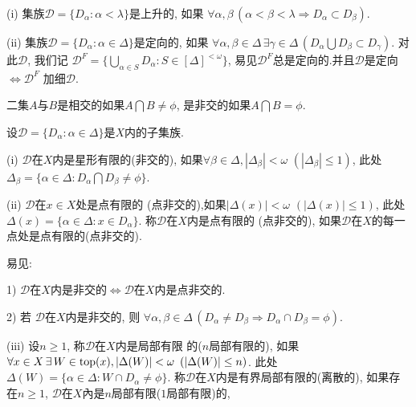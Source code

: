 \documentclass[main.tex]{subfiles}
\begin{document}
\begin{definition}
\textnormal{(i)} 集族$\mathscr{D}=\{D_\alpha: \alpha<\lambda\}$是上升的,
如果
$\forall\alpha, \beta \,(\alpha < \beta < \lambda \Rightarrow D_\alpha \subset D_\beta )$.

\textnormal{(ii)}  集族$\mathscr{D}=\{D_\alpha: \alpha\in\Delta\}$是定向的,
如果
$\forall\alpha, \beta\in\Delta\,\exists \gamma\in \Delta\,
(D_\alpha \bigcup D_\beta \subset D_\gamma)$.
对此$\mathscr{D}$, 我们记
$\mathscr{D}^F = \{\bigcup_{\alpha\in S} D_\alpha: S\in [\Delta]^{<\omega}\}$,
易见$\mathscr{D}^F$总是定向的.并且$\mathscr{D}$是定向
$\Leftrightarrow \mathscr{D}^F$ 加细$\mathscr{D}$.
\end{definition}
二集$A$与$B$是相交的如果$A\bigcap B\ne \phi$, 
是非交的如果$A\bigcap B=\phi$.

\begin{definition}
设$\mathscr{D}=\{D_\alpha: \alpha\in \Delta\}$是$X$内的子集族.

\textnormal{(i)} $\mathscr{D}$在$X$内是星形有限的\textnormal{(}非交的\textnormal{)}, 
如果$\forall\beta\in\Delta, |\Delta_\beta| < \omega$ $(|\Delta_\beta| \le 1)$, 此处
$\Delta_\beta = \{\alpha\in\Delta: D_\alpha\bigcap D_\beta \ne \phi\}$.
 
\textnormal{(ii)} $\mathscr{D}$在$x\in X$处是点有限的
\textnormal{(}点非交的\textnormal{)},如果$|\Delta(x)| < \omega$ $(|\Delta(x)| \le 1)$, 此处
$\Delta(x) = \{\alpha\in\Delta: x\in D_\alpha\}$.
称$\mathscr{D}$在$X$内是点有限的 
\textnormal{(}点非交的\textnormal{)}, 如果$\mathscr{D}$在$X$的每一点处是点有限的\textnormal{(}点非交的\textnormal{)}.

\textnormal{
易见:}

\textnormal{1) $\mathscr{D}$在$X$内是非交的$\Leftrightarrow$$\mathscr{D}$在$X$内是点非交的.
}

\textnormal{2) 若 $\mathscr{D}$在$X$内是非交的, 则
$\forall \alpha,\beta\in\Delta \,(D_\alpha \ne D_\beta
\Rightarrow D_\alpha\cap D_\beta = \phi).$
}

\textnormal{(iii)} 设$n\ge 1$, 称$\mathscr{D}$在$X$内是局部有限
的\textnormal{(}$n$局部有限的\textnormal{)}, 如果
$\forall x\in X\, \exists\,W\in\textnormal{top}(x), |\Delta(W)| < \omega\,\,\, (|\Delta(W)| \le n)$.
此处$\Delta(W)= \{\alpha\in \Delta: W\cap D_\alpha \ne \phi\}$.
称$\mathscr{D}$在$X$内是有界局部有限的\textnormal{(}离散的\textnormal{)},
如果存在$n\ge 1$, 
$\mathscr{D}$在$X$內是$n$局部有限\textnormal{(}$1$局部有限\textnormal{)}的,

\end{definition}
\end{document}
